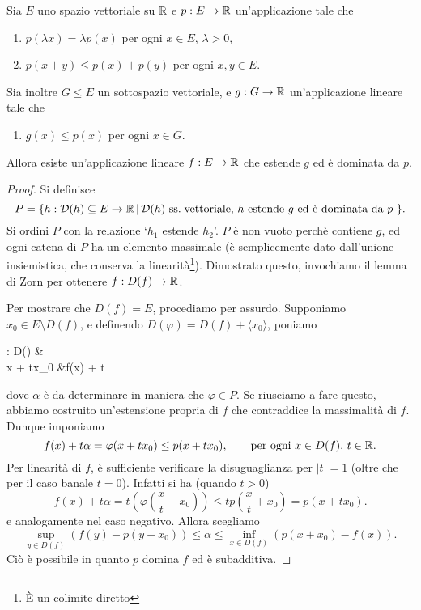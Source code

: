 \begin{theorem}
\label{th:hahn_banach}
	Sia $E$ uno spazio vettoriale su $\mathbb{R}$ e $p : E \to \mathbb{R}$ un'applicazione tale che
	\begin{enumerate}
		\item $p(\lambda x) = \lambda p(x)$ per ogni $x \in E$, $\lambda > 0$,
		\item $p(x+y) \leq p(x) + p(y)$ per ogni $x,y \in E$.
	\end{enumerate}
	Sia inoltre $G \leq E$ un sottospazio vettoriale, e $g:G \to \mathbb{R}$ un'applicazione lineare tale che
	\begin{enumerate}[resume]
		\item $g(x) \leq p(x)$ per ogni $x \in G$.
	\end{enumerate}
	Allora esiste un'applicazione lineare $f : E \to \mathbb{R}$ che estende $g$ ed è dominata da $p$.
\end{theorem}
\begin{proof}
	Si definisce
	\begin{equation*}
		P = \{ h : \mathcal D(h) \subseteq E \to \mathbb{R} \,|\, \text{$\mathcal D(h)$ ss.\! vettoriale, $h$ estende $g$ ed è dominata da $p$ } \}.
	\end{equation*}
	Si ordini $P$ con la relazione `$h_1$ estende $h_2$'. $P$ è non vuoto perchè contiene $g$, ed ogni catena di $P$ ha un elemento massimale (è semplicemente dato dall'unione insiemistica, che conserva la linearità\footnote{È un colimite diretto}). Dimostrato questo, invochiamo il lemma di Zorn per ottenere $f : D(f) \to \mathbb{R}$.

	Per mostrare che $D(f) = E$, procediamo per assurdo.
	Supponiamo $x_0 \in E \setminus D(f)$, e definendo $D(\varphi) = D(f) + \langle x_0 \rangle$, poniamo
	\begin{eqalign*}
		\varphi : D(\varphi) &\longto \R\\
				x + tx_0 &\longmapsto f(x) + t \alpha
	\end{eqalign*}
	dove $\alpha$ è da determinare in maniera che $\varphi \in P$. Se riusciamo a fare questo, abbiamo costruito un'estensione propria di $f$ che contraddice la massimalità di $f$.
	Dunque imponiamo
	\begin{equation*}
		f(x) + t\alpha = \varphi(x+tx_0) \leq p(x+tx_0), \qquad \text{per ogni $x \in D(f)$, $t \in \mathbb{R}$}.
	\end{equation*}
	Per linearità di $f$, è sufficiente verificare la disuguaglianza per $|t|=1$ (oltre che per il caso banale $t=0$). Infatti si ha (quando $t > 0$)
	\begin{equation*}
		f(x) + t\alpha = t\left(\varphi\left(\frac{x}{t} + x_0\right)\right) \leq t p\left(\frac{x}{t} + x_0\right) = p(x + tx_0).
	\end{equation*}
	e analogamente nel caso negativo. Allora scegliamo
	\begin{equation*}
		\sup_{y \in D(f)} (f(y) - p(y-x_0)) \leq \alpha \leq \inf_{x \in D(f)} (p(x+x_0) - f(x)).
	\end{equation*}
	Ciò è possibile in quanto $p$ domina $f$ ed è subadditiva.
\end{proof}


